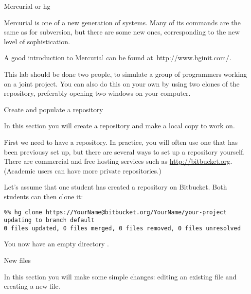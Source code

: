  {Mercurial or hg}

Mercurial is one of a new generation of  systems. Many of its commands are the same as for subversion,
but there are some new ones, corresponding to the new level of 
sophistication.

A good introduction to Mercurial can be found
at~\url{http://www.hginit.com/}.

This lab should be done two people, to simulate a group
of programmers working on a joint project. You can also do this on
your own by using two clones of the repository, 
preferably opening two windows on your computer.

 {Create and populate a repository}

\begin{purpose}
  In this section you will create a repository and make a local copy
  to work on.
\end{purpose}

First we need to have a repository. In practice, you will often use
one that has been previousy set up, but there are several ways to
set up a repository yourself.
There are commercial and free hosting services such as
  \url{http://bitbucket.org}. (Academic users can have more private
  repositories.)

Let's assume that one student has created a repository 
on Bitbucket. Both students can then clone it:
\begin{verbatim}
%% hg clone https://YourName@bitbucket.org/YourName/your-project
updating to branch default
0 files updated, 0 files merged, 0 files removed, 0 files unresolved
\end{verbatim}
You now have an empty directory .


 {New files}
\label{sec:hg-push}

\begin{purpose}
  In this section you will make some simple changes: editing an
  existing file and creating a new file.
\end{purpose}

